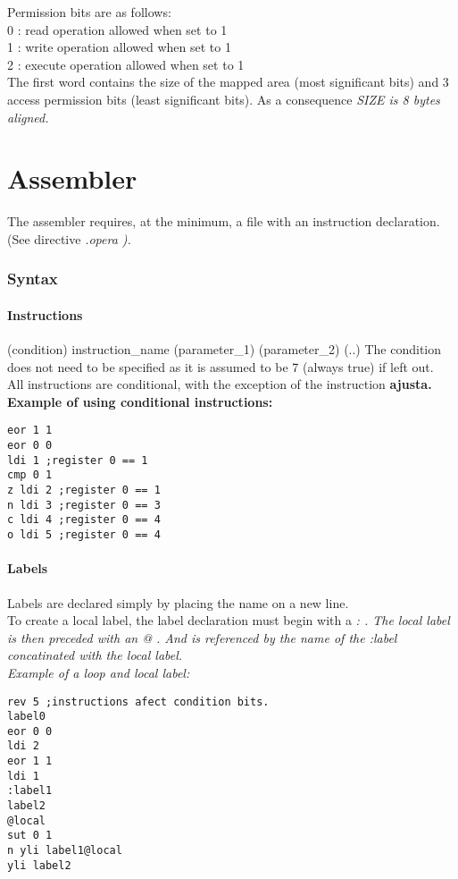 \documentclass[a4paper,11pt]{article}
\begin{document}
Permission bits are as follows:\\
0 : read operation allowed when set to 1\\
1 : write operation allowed when set to 1\\
2 : execute operation allowed when set to 1\\

The first word contains the size of the mapped area (most significant bits) and 3 access permission bits (least significant bits). As a consequence \sl SIZE \rm is 8 bytes aligned.\\

\pagebreak
\part{Assembler}
The assembler requires, at the minimum, a file with an instruction declaration. (See directive \sl .opera \rm). \\

\section{Syntax}

\subsection{Instructions} 
(condition) instruction\_name (parameter\_1) (parameter\_2) (..)
The condition does not need to be specified as it is assumed to be 7 (always true) if left out.\\
All instructions are conditional, with the exception of the instruction \bf ajusta\rm.
Example of using conditional instructions:\\
\begin{verbatim}
eor 1 1
eor 0 0
ldi 1 ;register 0 == 1
cmp 0 1
z ldi 2 ;register 0 == 1
n ldi 3 ;register 0 == 3
c ldi 4 ;register 0 == 4
o ldi 5 ;register 0 == 4
\end{verbatim}

\subsection{Labels}
Labels are declared simply by placing the name on a new line.\\
To create a local label, the label declaration must begin with a \sl : \rm. The local label is then preceded with an \sl @ \rm. And is referenced by the name of the \sl :\rm label concatinated with the local label.\\
Example of a loop and local label:\\
\begin{verbatim}
rev 5 ;instructions afect condition bits.
label0
eor 0 0
ldi 2
eor 1 1
ldi 1
:label1
label2 
@local
sut 0 1
n yli label1@local
yli label2
\end{verbatim}
\end{document}
